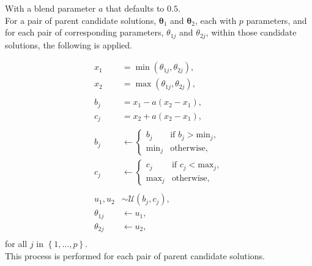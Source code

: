 \documentclass[
  a4paper,
  DIV=11,
  numbers=noendperiod]{scrartcl}
\newcommand{\B}[1]{\boldsymbol{#1}}
\newcommand{\+}{\phantom{-}}
\newcommand{\op}[2]{\operatorname{#1}\left(#2\right)}
\begin{document}
\begin{tcolorbox}[title=Blend crossover: \texttt{gareal\_blxCrossover()}]
With a blend parameter $a$ that defaults to $0.5$.
\\

For a pair of parent candidate solutions, $\B\theta_1$ and $\B\theta_2$, each with $p$ parameters, and for each pair of corresponding parameters, $\theta_{1j}$ and $\theta_{2j}$, within those candidate solutions, the following is applied.

$$
\begin{aligned}
x_1 &= \op\min{\theta_{1j}, \theta_{2j}}, \\
x_2 &= \op\max{\theta_{1j}, \theta_{2j}}, \\
\\
b_j &= x_1 - a\left(x_2-x_1\right), \\
c_j &= x_2 + a\left(x_2-x_1\right), \\
\\
b_j &\leftarrow 
\begin{cases}
b_j &\text{if } b_j>\text{min}_j,\\
\text{min}_j &\text{otherwise},
\end{cases}\\
c_j &\leftarrow 
\begin{cases}
c_j &\text{if } c_j<\text{max}_j,\\
\text{max}_j &\text{otherwise},
\end{cases} \\
\\
u_1,u_2 &\sim \mathcal U \!\left(b_j,c_j\right),\\
\theta_{1j} &\leftarrow u_1,\\
\theta_{2j} &\leftarrow u_2,\\
\end{aligned}
$$
for all $j$ in $\left\{1, \dots, p\right\}$.\\

This process is performed for each pair of parent candidate solutions.
\end{tcolorbox}
\end{document}
